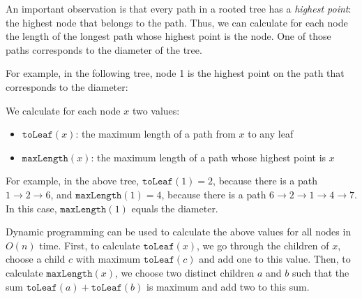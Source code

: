 An important observation is that every path
in a rooted tree has a \emph{highest point}:
the highest node that belongs to the path.
Thus, we can calculate for each node the length
of the longest path whose highest point is the node.
One of those paths corresponds to the diameter of the tree.

For example, in the following tree,
node 1 is the highest point on the path
that corresponds to the diameter:
\begin{center}
\end{center}

We calculate for each node $x$ two values:
\begin{itemize}
\item $\texttt{toLeaf}(x)$: the maximum length of a path from $x$ to any leaf
\item $\texttt{maxLength}(x)$: the maximum length of a path
whose highest point is $x$
\end{itemize}
For example, in the above tree,
$\texttt{toLeaf}(1)=2$, because there is a path
$1 \rightarrow 2 \rightarrow 6$,
and $\texttt{maxLength}(1)=4$,
because there is a path
$6 \rightarrow 2 \rightarrow 1 \rightarrow 4 \rightarrow 7$.
In this case, $\texttt{maxLength}(1)$ equals the diameter.

Dynamic programming can be used to calculate the above
values for all nodes in $O(n)$ time.
First, to calculate $\texttt{toLeaf}(x)$,
we go through the children of $x$,
choose a child $c$ with maximum $\texttt{toLeaf}(c)$
and add one to this value.
Then, to calculate $\texttt{maxLength}(x)$,
we choose two distinct children $a$ and $b$
such that the sum $\texttt{toLeaf}(a)+\texttt{toLeaf}(b)$
is maximum and add two to this sum.

